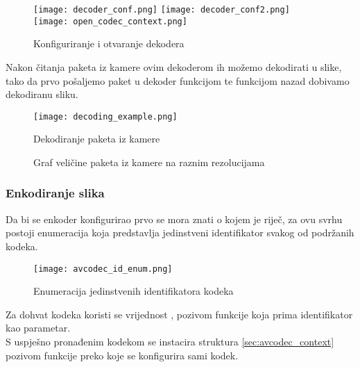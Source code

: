 \begin{figure}[h]
  \texttt{[image: decoder\_conf.png]}
  \texttt{[image: decoder\_conf2.png]}
  \texttt{[image: open\_codec\_context.png]}
  \caption{Konfiguriranje i otvaranje dekodera}
\end{figure}
\noindent
Nakon čitanja paketa iz kamere ovim dekoderom ih možemo dekodirati u slike, tako da prvo pošaljemo paket u
dekoder funkcijom  te funkcijom  nazad dobivamo 
dekodiranu sliku.
\begin{figure}[h]
  \texttt{[image: decoding\_example.png]}
  \caption{Dekodiranje paketa iz kamere}
\end{figure}

\begin{figure}[h]
  \centering
  \caption{Graf veličine  paketa iz kamere na raznim rezolucijama} \label{pic:packet_size}
\end{figure}
\clearpage


\subsubsection{Enkodiranje slika} \label{sec:encoding}
Da bi se enkoder konfigurirao prvo se mora znati o kojem je riječ, za ovu svrhu postoji enumeracija  \cite{ffmpegDocs}
koja predstavlja jedinstveni identifikator svakog od podržanih kodeka.
\begin{figure}[h]
  \centering
  \texttt{[image: avcodec\_id\_enum.png]}
  \caption{\small Enumeracija jedinstvenih identifikatora kodeka}
\end{figure}
\paraBreak
Za dohvat  kodeka koristi se vrijednost , pozivom funkcije 
koja prima identifikator kao parametar. \\
S uspješno pronađenim kodekom se instacira struktura  \ref{sec:avcodec_context} pozivom funkcije
 preko koje se konfigurira sami kodek.

